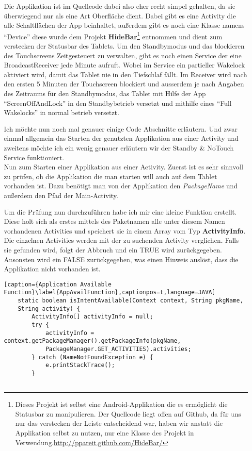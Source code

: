 \begin{flushleft}
Die Applikation ist im Quellcode dabei also eher recht simpel gehalten, da sie überwiegend nur als eine Art Oberfläche dient. Dabei gibt es eine Activity die alle Schaltflächen der App beinhaltet, außerdem gibt es noch eine Klasse namens ``Device'' diese wurde dem Projekt \textbf{HideBar}\footnote{Dieses Projekt ist selbst eine Android-Applikation die es ermöglicht die Statusbar zu manipulieren. Der Quellcode liegt offen auf Github, da für uns nur das verstecken der Leiste entscheidend war, haben wir anstatt die Applikation selbst zu nutzen, nur eine Klasse des Projekt in Verwendung.\url{http://ppareit.github.com/HideBar/}} entnommen und dient zum verstecken der Statusbar des Tablets. Um den Standbymodus und das blockieren des Touchscreens Zeitgesteuert zu verwalten, gibt es noch einen Service der eine BroadcastReceiver jede Minute aufruft. Wobei im Service ein partieller Wakelock aktiviert wird, damit das Tablet nie in den Tiefschlaf fällt. Im Receiver wird nach den ersten 5 Minuten der Touchscreen blockiert und ausserdem je nach Angaben des Zeitraums für den Standbymodus, das Tablet mit Hilfe der App ``ScreenOffAndLock'' in den Standbybetrieb versetzt und mithilfe eines ``Full Wakelocks'' in normal betrieb versetzt.

Ich möchte nun noch mal genauer einige Code Abschnitte erläutern. Und zwar einmal allgemein das Starten der genutzten Applikation aus einer Activity und zweitens möchte ich ein wenig genauer erläutern wir der Standby \& NoTouch Service funktioniert.\\
\vspace{1cm} \hspace{1cm}
Nun zum Starten einer Applikation aus einer Activity. Zuerst ist es sehr sinnvoll zu prüfen, ob die Applikation die man starten will auch auf dem Tablet vorhanden ist. Dazu benötigt man von der Applikation den \textit{PackageName} und außerdem den Pfad der Main-Activity.

Um die Prüfung nun durchzuführen habe ich mir eine kleine Funktion erstellt. Diese holt sich als erstes mittels des Paketnamen alle unter diesem Namen vorhandenen Activities und speichert sie in einem Array vom Typ \textbf{ActivityInfo}. Die einzelnen Activities werden mit der zu suchenden Activity verglichen. Falls sie gefunden wird, folgt der Abbruch und ein TRUE wird zurückgegeben. Ansonsten wird ein FALSE zurückgegeben, was einen Hinweis auslöst, dass die Applikation nicht vorhanden ist.

\begin{lstlisting}[caption={Application Available Function}\label{AppAvailFunction},captionpos=t,language=JAVA] 
	static boolean isIntentAvailable(Context context, String pkgName, 
	String activity) {
		ActivityInfo[] activityInfo = null;
		try {
			activityInfo = context.getPackageManager().getPackageInfo(pkgName,
			PackageManager.GET_ACTIVITIES).activities;
		} catch (NameNotFoundException e) {
			e.printStackTrace();
		}
				

\end{lstlisting}
\end{flushleft}
